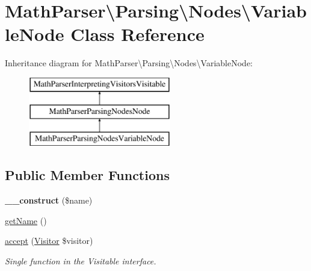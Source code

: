 \hypertarget{classMathParser_1_1Parsing_1_1Nodes_1_1VariableNode}{\section{Math\-Parser\textbackslash{}Parsing\textbackslash{}Nodes\textbackslash{}Variable\-Node Class Reference}
\label{classMathParser_1_1Parsing_1_1Nodes_1_1VariableNode}
}
Inheritance diagram for Math\-Parser\textbackslash{}Parsing\textbackslash{}Nodes\textbackslash{}Variable\-Node\-:\begin{figure}[H]
\begin{center}
\leavevmode
\includegraphics[height=3.000000cm]{classMathParser_1_1Parsing_1_1Nodes_1_1VariableNode}
\end{center}
\end{figure}
\subsection*{Public Member Functions}
\begin{DoxyCompactItemize}
\item 
\hypertarget{classMathParser_1_1Parsing_1_1Nodes_1_1VariableNode_a5a1263313e8f1f7fb82ef1375b0aee77}{{\bfseries \-\_\-\-\_\-construct} (\$name)}\label{classMathParser_1_1Parsing_1_1Nodes_1_1VariableNode_a5a1263313e8f1f7fb82ef1375b0aee77}

\item 
\hyperlink{classMathParser_1_1Parsing_1_1Nodes_1_1VariableNode_abab1fcd4af04ba2981749368d854cfc3}{get\-Name} ()
\item 
\hyperlink{classMathParser_1_1Parsing_1_1Nodes_1_1VariableNode_a1c41ef12cc6469a2de9c2de325cf6258}{accept} (\hyperlink{interfaceMathParser_1_1Interpreting_1_1Visitors_1_1Visitor}{Visitor} \$visitor)
\begin{DoxyCompactList}\small\item\em Single function in the Visitable interface. \end{DoxyCompactList}\end{DoxyCompactItemize}
